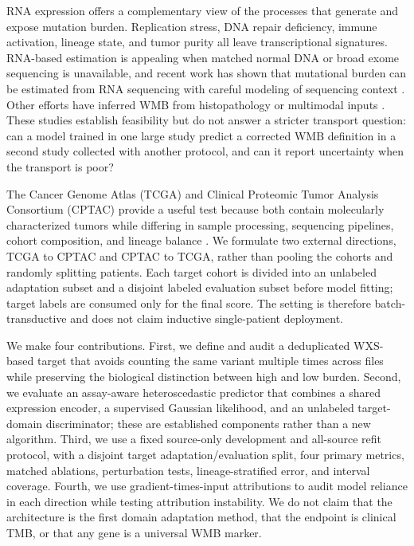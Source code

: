\documentclass[11pt]{article}
\begin{document}
RNA expression offers a complementary view of the processes that generate and expose mutation burden. Replication stress, DNA repair deficiency, immune activation, lineage state, and tumor purity all leave transcriptional signatures. RNA-based estimation is appealing when matched normal DNA or broad exome sequencing is unavailable, and recent work has shown that mutational burden can be estimated from RNA sequencing with careful modeling of sequencing context \citep{Bailey2022TMBRNA}. Other efforts have inferred WMB from histopathology or multimodal inputs \citep{Huang2022TMBHistology}. These studies establish feasibility but do not answer a stricter transport question: can a model trained in one large study predict a corrected WMB definition in a second study collected with another protocol, and can it report uncertainty when the transport is poor?

The Cancer Genome Atlas (TCGA) and Clinical Proteomic Tumor Analysis Consortium (CPTAC) provide a useful test because both contain molecularly characterized tumors while differing in sample processing, sequencing pipelines, cohort composition, and lineage balance \citep{CancerGenomeAtlas2013,Mertins2016CPTAC,DJ201966234}. We formulate two external directions, TCGA to CPTAC and CPTAC to TCGA, rather than pooling the cohorts and randomly splitting patients. Each target cohort is divided into an unlabeled adaptation subset and a disjoint labeled evaluation subset before model fitting; target labels are consumed only for the final score. The setting is therefore batch-transductive and does not claim inductive single-patient deployment.

We make four contributions. First, we define and audit a deduplicated WXS-based target that avoids counting the same variant multiple times across files while preserving the biological distinction between high and low burden. Second, we evaluate an assay-aware heteroscedastic predictor that combines a shared expression encoder, a supervised Gaussian likelihood, and an unlabeled target-domain discriminator; these are established components rather than a new algorithm. Third, we use a fixed source-only development and all-source refit protocol, with a disjoint target adaptation/evaluation split, four primary metrics, matched ablations, perturbation tests, lineage-stratified error, and interval coverage. Fourth, we use gradient-times-input attributions to audit model reliance in each direction while testing attribution instability. We do not claim that the architecture is the first domain adaptation method, that the endpoint is clinical TMB, or that any gene is a universal WMB marker.
\end{document}
